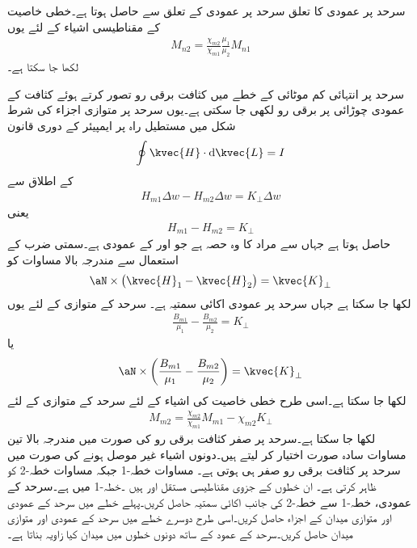 سرحد پر عمودی  کا تعلق سرحد پر عمودی  کے تعلق سے حاصل ہوتا ہے۔خطی خاصیت کے مقناطیسی اشیاء کے لئے یوں
\begin{align}
M_{n2}=\frac{\chi_{m2}}{\chi_{m1}}\frac{\mu_1}{\mu_2}M_{n1}
\end{align}
لکھا جا سکتا ہے۔

سرحد پر انتہائی کم موٹائی کے خطے میں کثافت برقی رو  تصور کرتے ہوئے کثافت کے عمودی  چوڑائی پر برقی رو  لکھی جا سکتی ہے۔یوں سرحد پر متوازی اجزاء کی شرط شکل میں مستطیل راہ پر ایمپیئر کے دوری قانون
\begin{align*}
\oint \kvec{H} \cdot \dif \kvec{L}=I
\end{align*}
کے اطلاق سے
\begin{align*}
H_{m1} \Delta w -H_{m2}\Delta w=K_\perp \Delta w
\end{align*}
یعنی
\begin{align}
H_{m1} -H_{m2}=K_\perp
\end{align}
 حاصل ہوتا ہے جہاں  سے مراد  کا وہ حصہ ہے جو  اور  کے عمودی ہے۔سمتی ضرب کے استعمال سے مندرجہ بالا مساوات کو
\begin{align}
\aN \times \left(\kvec{H}_1-\kvec{H}_2 \right)  =\kvec{K}_{\perp}
\end{align}
لکھا جا سکتا ہے جہاں  سرحد پر عمودی اکائی سمتیہ  ہے۔ سرحد کے متوازی  کے لئے یوں
\begin{align}
\frac{B_{m1}}{\mu_1}-\frac{B_{m2}}{\mu_2}=K_\perp
\end{align}
یا
\begin{align}
\aN \times \left(\frac{B_{m1}}{\mu_1}-\frac{B_{m2}}{\mu_2}\right)=\kvec{K}_\perp
\end{align}
لکھا جا سکتا ہے۔اسی طرح خطی خاصیت کی اشیاء کے لئے سرحد کے متوازی  کے لئے
\begin{align}
M_{m2}=\frac{\chi_{m2}}{\chi_{m1}} M_{m1}-\chi_{m2} K_\perp
\end{align}
لکھا جا سکتا ہے۔سرحد پر صفر کثافت برقی رو کی صورت میں مندرجہ بالا تین مساوات سادہ صورت اختیار کر لیتے ہیں۔دونوں اشیاء غیر موصل ہونے کی صورت میں سرحد پر کثافت برقی رو صفر ہی ہوتی ہے۔
مساوات  خطہ-1 جبکہ مساوات  خطہ-2 کو ظاہر کرتی ہے۔ ان خطوں کے جزوی مقناطیسی مستقل  اور  ہیں ۔خطہ-1 میں  ہے۔سرحد کے عمودی، خطہ-1 سے خطہ-2 کی جانب  اکائی سمتیہ  حاصل کریں۔پہلے خطے  میں سرحد کے عمودی اور متوازی میدان کے اجزاء حاصل کریں۔اسی طرح دوسرے خطے میں سرحد کے عمودی اور متوازی میدان حاصل کریں۔سرحد کے عمود کے ساتھ دونوں خطوں میں میدان کیا زاویہ بناتا ہے۔


